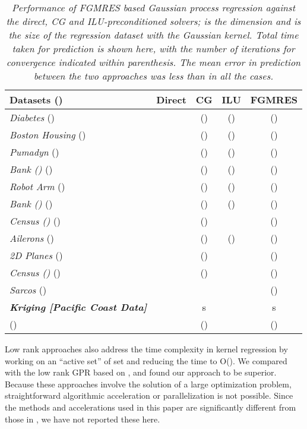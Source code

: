 \documentclass[10pt,journal,letterpaper,compsoc]{IEEEtran}
\begin{document}
\begin{table*}[bth]
\caption{\emph{Performance of FGMRES based Gaussian process regression against the direct, CG \cite{GPML_Mackay} and ILU-preconditioned solvers;  is the dimension and  is the size of the regression dataset with the Gaussian kernel. Total time taken for prediction is shown here, with the number of iterations for convergence indicated within parenthesis. The mean error in prediction between the two approaches was less than  in all the cases.}\label{table:fgmres_gpr}}
\centering
\begin{tabular}{||l|c|c|c|c||}
\hline\hline
Datasets ()	& Direct \cite{GPML_Rasmussen} & CG \cite{GPML_Mackay} 	& ILU & FGMRES\\
\hline\hline
\emph{Diabetes} ()	&  	&  () 	&  () 	&  ()\\
\emph{Boston Housing} ()	&  	&  () 	&  () 	&  ()\\
\emph{Pumadyn} ()	&  	&  () 	&  () 	&  ()\\
\emph{Bank ()} ()	&  	&  () 	&  () 	&  ()\\
\emph{Robot Arm} ()	&  	&  () 	&  () 	&  ()\\
\emph{Bank ()} ()	&  	&  () 	&  () 	&  ()\\
\emph{Census ()} ()	&  	&  () 	&  	&  ()\\
\emph{Ailerons} ()	&  	&  () 	&  () 	&  ()\\
\emph{2D Planes} ()	&  	&  () 	&  	&  ()\\
\emph{Census ()} ()	&  	&  () 	&  	&  ()\\
\emph{Sarcos} ()	&  	&  	&  	&  ()\\
\hline\hline
\emph{\textbf{Kriging [Pacific Coast Data]}} &  & s &  & s \\
() 	&  & () &  & ()\\ \hline\hline
\end{tabular}
\end{table*}

Low rank approaches \cite{SnelsonGhahramani,Seeger2003,SPGP} also address the time complexity in kernel regression by working on an ``active set'' of set  and reducing the time to O(). We compared with the low rank GPR based on \cite{SPGP}, and found our approach to be superior. Because these approaches involve the solution of a large optimization problem, straightforward algorithmic acceleration or parallelization is not possible. Since the methods and accelerations used in this paper are significantly different from those in \cite{SPGP}, we have not reported these here.
\end{document}
